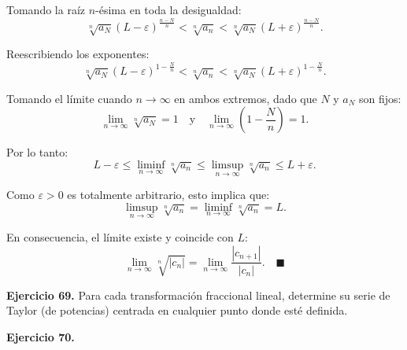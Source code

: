\documentclass[11pt,a4paper]{article}
\theoremstyle{definition}
\theoremstyle{plain}
\theoremstyle{remark}
\begin{document}
	Tomando la raíz $n$-ésima en toda la desigualdad:
	\[
	\sqrt[n]{a_N} (L - \varepsilon)^{\frac{n-N}{n}} < \sqrt[n]{a_n} < \sqrt[n]{a_N} (L + \varepsilon)^{\frac{n-N}{n}}.
	\]
	
	Reescribiendo los exponentes:
	\[
	\sqrt[n]{a_N} (L - \varepsilon)^{1 - \frac{N}{n}} < \sqrt[n]{a_n} < \sqrt[n]{a_N} (L + \varepsilon)^{1 - \frac{N}{n}}.
	\]
	
	Tomando el límite cuando $n \to \infty$ en ambos extremos, dado que $N$ y $a_N$ son fijos:
	\[
	\lim_{n \to \infty} \sqrt[n]{a_N} = 1 \quad \text{y} \quad \lim_{n \to \infty} \left(1 - \frac{N}{n}\right) = 1.
	\]
	
	Por lo tanto:
	\[
	L - \varepsilon \le \liminf_{n \to \infty} \sqrt[n]{a_n} \le \limsup_{n \to \infty} \sqrt[n]{a_n} \le L + \varepsilon.
	\]
	
	Como $\varepsilon > 0$ es totalmente arbitrario, esto implica que:
	\[
	\limsup_{n \to \infty} \sqrt[n]{a_n} = \liminf_{n \to \infty} \sqrt[n]{a_n} = L.
	\]
	
	En consecuencia, el límite existe y coincide con $L$:
	\[
	\lim_{n \to \infty} \sqrt[n]{|c_n|} = \lim_{n \to \infty} \frac{|c_{n+1}|}{|c_n|}. \quad \blacksquare
	\]
	
	\vspace{1em}
	\noindent \textbf{Ejercicio 69.} Para cada transformación fraccional lineal, determine su serie de Taylor (de potencias) centrada en cualquier punto donde esté definida.
	
	\noindent \textbf{Ejercicio 70.}
	
\end{document}
